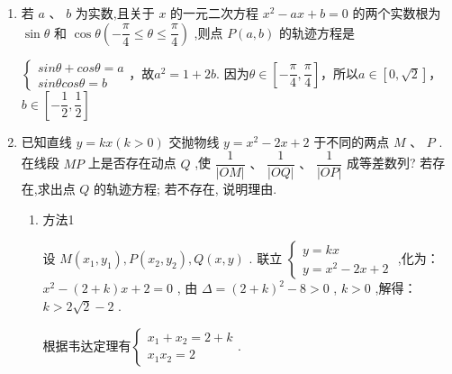 \begin{enumerate}
    \item 若 $a\text{ 、 }b$ 为实数,且关于 $x$ 的一元二次方程 ${x}^{2} - {ax} + b = 0$ 的两个实数根为 $\sin \theta$ 和 $\cos \theta \left( {-\dfrac{\pi }{4} \leq  \theta  \leq  \dfrac{\pi }{4}}\right)$ ,则点 $P\left( {a,b}\right)$ 的轨迹方程是 
    \begin{jieda}
        $\left\{\begin{array}{l}
            sin\theta + cos\theta = a \\
            sin\theta cos\theta = b 
        \end{array}\right.$，故$a^2 = 1+2b$. 因为$\theta \in \left[-\dfrac{\pi}{4}, \dfrac{\pi}{4}\right]$，所以$a \in [0, \sqrt{2}]$，$b \in \left[-\dfrac{1}{2}, \dfrac{1}{2}\right]$
    \end{jieda}


    \item 已知直线 $y = {kx}\left( {k > 0}\right)$ 交抛物线 $y = {x}^{2} - {2x} + 2$ 于不同的两点 $M$ 、 $P$ . 在线段 ${MP}$ 上是否存在动点 $Q$ ,使 $\dfrac{1}{\left| OM\right| }\text{ 、 }\dfrac{1}{\left| OQ\right| }\text{ 、 }\dfrac{1}{\left| OP\right| }$ 成等差数列? 若存在,求出点 $Q$ 的轨迹方程; 若不存在, 说明理由.
    \begin{jieda}
        \begin{enumerate}
            \item 方法1 

            设 $M\left( {{x}_{1},{y}_{1}}\right) ,P\left( {{x}_{2},{y}_{2}}\right) ,Q\left( {x,y}\right)$ .
            联立 $\left\{  \begin{array}{l} y = {kx} \\  y = {x}^{2} - {2x} + 2 \end{array}\right.$ ,化为：
            ${x}^{2} - \left( {2 + k}\right) x + 2 = 0$ ,
            由 $\Delta = {\left( 2 + k\right) }^{2} - 8 > 0$ , $k > 0$ ,解得：
            $k > 2\sqrt{2} - 2$ .
            
            根据韦达定理有$\left\{ \begin{array}{l}
                 {x}_{1} + {x}_{2} = 2 + k \\
                 {x}_{1}{x}_{2} = 2
            \end{array}\right.$.
            

\end{enumerate}
\end{jieda}
\end{enumerate}
